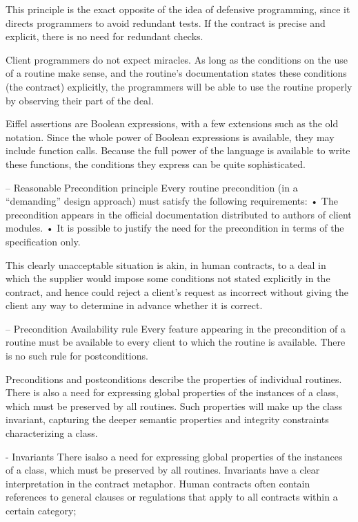 This principle is the exact opposite of the idea of defensive programming, since
it directs programmers to avoid redundant tests.
If the contract is precise and explicit, there is no need for redundant checks.

Client programmers do not expect miracles.
As long as the conditions on the use of a routine make sense, and the routine’s
documentation states these conditions (the contract) explicitly, the programmers
will be able to use the routine properly by observing their part of the deal.

Eiffel assertions are Boolean expressions, with a few extensions such as the old
notation. Since the whole power of Boolean expressions is available, they may
include function calls. Because the full power of the language is available to
write these functions, the conditions they express can be quite sophisticated.
\cite{meyer1992applying}


 









-- Reasonable Precondition principle
Every routine precondition (in a “demanding” design approach) must satisfy
the following requirements:
• The precondition appears in the official documentation distributed to
authors of client modules.
• It is possible to justify the need for the precondition in terms of the
specification only.

This clearly unacceptable situation is akin,
in human contracts, to a deal in which the supplier would impose some conditions not
stated explicitly in the contract, and hence could reject a client’s request as incorrect
without giving the client any way to determine in advance whether it is correct.

-- Precondition Availability rule
Every feature appearing in the precondition of a routine must be available to
every client to which the routine is available.
There is no such rule for postconditions.


Preconditions and postconditions describe the properties of individual routines. There is
also a need for expressing global properties of the instances of a class, which must be
preserved by all routines. Such properties will make up the class invariant, capturing the
deeper semantic properties and integrity constraints characterizing a class.

- Invariants 
There isalso a need for expressing global properties of the instances of a class, which must be
preserved by all routines.
Invariants have a clear interpretation in the contract metaphor. Human contracts often
contain references to general clauses or regulations that apply to all contracts within a
certain category;
\cite{meyer1997object}







